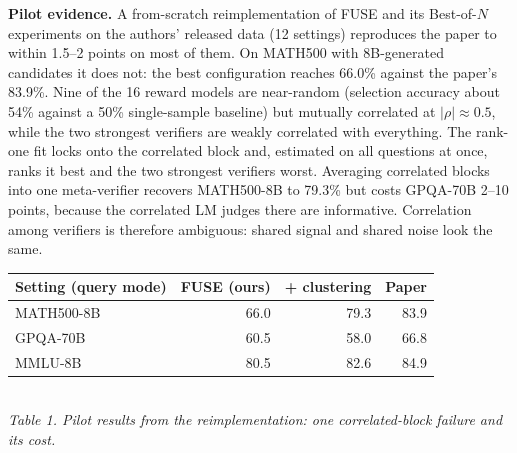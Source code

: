 \documentclass[11pt]{article}
\begin{document}
\textbf{Pilot evidence.} A from-scratch reimplementation of FUSE and its Best-of-$N$
experiments on the authors' released data (12 settings) reproduces the paper to within
1.5--2 points on most of them. On MATH500 with 8B-generated candidates it does not: the
best configuration reaches 66.0\% against the paper's 83.9\%. Nine of the 16 reward models
are near-random (selection accuracy about 54\% against a 50\% single-sample baseline) but
mutually correlated at $|\rho|\approx 0.5$, while the two strongest verifiers are weakly
correlated with everything. The rank-one fit locks onto the correlated block and, estimated
on all questions at once, ranks it best and the two strongest verifiers worst. Averaging
correlated blocks into one meta-verifier recovers MATH500-8B to 79.3\% but costs
GPQA-70B 2--10 points, because the correlated LM judges there are informative. Correlation
among verifiers is therefore ambiguous: shared signal and shared noise look the same.

\begin{center}\small
\begin{tabular}{lrrr}\toprule
Setting (query mode) & FUSE (ours) & + clustering & Paper \\\midrule
MATH500-8B & 66.0 & 79.3 & 83.9 \\
GPQA-70B & 60.5 & 58.0 & 66.8 \\
MMLU-8B & 80.5 & 82.6 & 84.9 \\\bottomrule
\end{tabular}\\[0.2em]
\textit{Table 1. Pilot results from the reimplementation: one correlated-block failure and its cost.}
\end{center}
\end{document}
